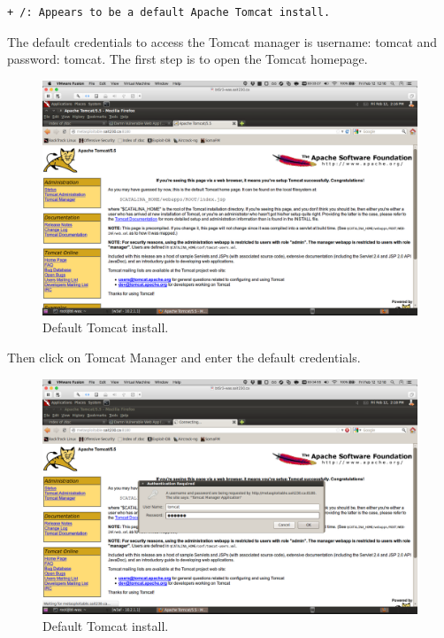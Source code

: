 \documentclass{article}
\begin{document}
\begin{lstlisting}
+ /: Appears to be a default Apache Tomcat install.
\end{lstlisting}

The default credentials to access the Tomcat manager is username: tomcat and password: tomcat.
The first step is to open the Tomcat homepage.

\begin{figure}[h!]
	\includegraphics[width=\linewidth]{images/tomcat-metasploitable.png}
	\caption{Default Tomcat install.}
	\label{fig:tomcat-injection1}
\end{figure}

Then click on Tomcat Manager and enter the default credentials.

\begin{figure}[h!]
	\includegraphics[width=\linewidth]{images/tomcat-metasploitable-credentials.png}
	\caption{Default Tomcat install.}
	\label{fig:tomcat-injection2}
\end{figure}
\end{document}
